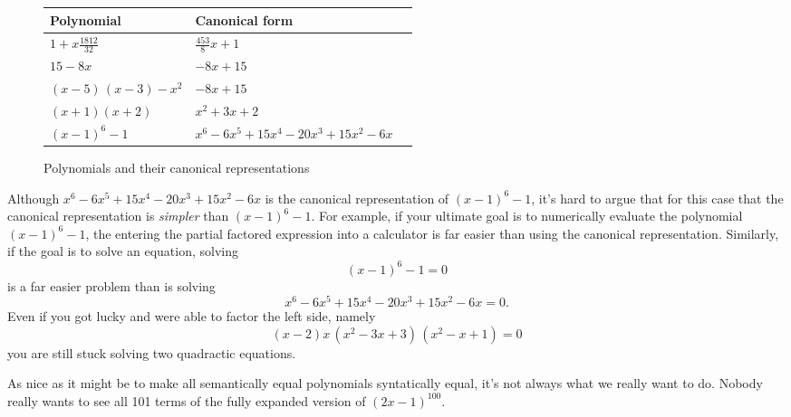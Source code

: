 \documentclass[12pt,fleqn]{article}
\begin{document}
{\begin{figure}[h]
\center
\begin{tabular}{|m{5.18cm}|m{7.18cm}|@{}m{0pt}@{}} \hline 
\textbf{Polynomial}  & \textbf{Canonical form} \\[7pt]  \hline
$  1 +  x \frac{1812}{32}$   &  $  \frac{453}{8} x + 1 $ \\[7pt]  \hline 
$ 15 - 8 x$  & $-8 x + 15$ \\[7pt]  \hline 
$\left( x-5\right) \, \left( x-3\right) -{{x}^{2}} $  & $-8 x + 15$  \\[7pt]  \hline 
$   (x+1)(x+2) $ &  $ x^2 + 3 x + 2$  \\[7pt]  \hline 
$   {{\left( x-1\right) }^{6}}-1  $  & ${{x}^{6}}-6 {{x}^{5}}+15 {{x}^{4}}-20 {{x}^{3}}+15 {{x}^{2}}-6 x $ \\[7pt]  \hline
\end{tabular}
\caption{Polynomials and their canonical representations}
\end{figure}
Although ${{x}^{6}}-6 {{x}^{5}}+15 {{x}^{4}}-20 {{x}^{3}}+15 {{x}^{2}}-6 x $ is the canonical representation of ${{\left( x-1\right) }^{6}}-1$, it's
hard to argue that for this case that the canonical representation is \emph{simpler} than ${{\left( x-1\right) }^{6}}-1$. For example, if your ultimate goal is to  numerically evaluate the polynomial  ${{\left( x-1\right) }^{6}}-1$, the entering the partial factored expression into a calculator is far easier
than using the canonical representation.  Similarly, if the goal is to solve an equation, solving
\begin{equation*}
  {{\left( x-1\right) }^{6}}-1 = 0
\end{equation*}
is a far easier problem than is solving
\begin{equation*}
  {{x}^{6}}-6 {{x}^{5}}+15 {{x}^{4}}-20 {{x}^{3}}+15 {{x}^{2}}-6 x  = 0.
\end{equation*}
Even if you got lucky and were able to factor the left side, namely
\begin{equation*}
\left( x-2\right)  x\, \left( {{x}^{2}}-3 x+3\right) \, \left( {{x}^{2}}-x+1\right)  = 0
\end{equation*}
you are still stuck solving two quadractic equations. 


As nice as it might be to make all semantically equal polynomials syntatically equal, it's not always what we really want to do.  Nobody
really wants to see all 101 terms of the fully expanded version of $(2  x-1)^100$.

}
\end{document}
